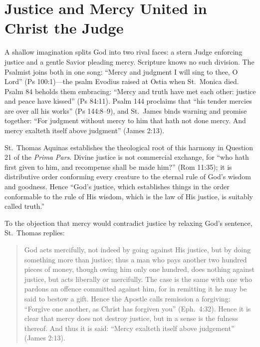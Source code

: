 \section{Justice and Mercy United in Christ the Judge}

A shallow imagination splits God into two rival faces: a stern Judge enforcing justice and a gentle Savior pleading mercy. Scripture knows no such division. The Psalmist joins both in one song: ``Mercy and judgment I will sing to thee, O Lord'' (Ps 100:1)---the psalm Evodius raised at Ostia when St.\ Monica died. Psalm 84 beholds them embracing: ``Mercy and truth have met each other: justice and peace have kissed'' (Ps 84:11). Psalm 144 proclaims that ``his tender mercies are over all his works'' (Ps 144:8--9), and St.\ James binds warning and promise together: ``For judgment without mercy to him that hath not done mercy. And mercy exalteth itself above judgment'' (James 2:13).

St.\ Thomas Aquinas establishes the theological root of this harmony in Question 21 of the \textit{Prima Pars}. Divine justice is not commercial exchange, for ``who hath first given to him, and recompense shall be made him?'' (Rom 11:35); it is distributive order conforming every creature to the eternal rule of God's wisdom and goodness. Hence ``God's justice, which establishes things in the order conformable to the rule of His wisdom, which is the law of His justice, is suitably called truth.''

To the objection that mercy would contradict justice by relaxing God's sentence, St.\ Thomas replies:

\begin{quote}
God acts mercifully, not indeed by going against His justice, but by doing something more than justice; thus a man who pays another two hundred pieces of money, though owing him only one hundred, does nothing against justice, but acts liberally or mercifully. The case is the same with one who pardons an offence committed against him, for in remitting it he may be said to bestow a gift. Hence the Apostle calls remission a forgiving: ``Forgive one another, as Christ has forgiven you'' (Eph.\ 4:32). Hence it is clear that mercy does not destroy justice, but in a sense is the fulness thereof. And thus it is said: ``Mercy exalteth itself above judgement'' (James 2:13).
\end{quote}

